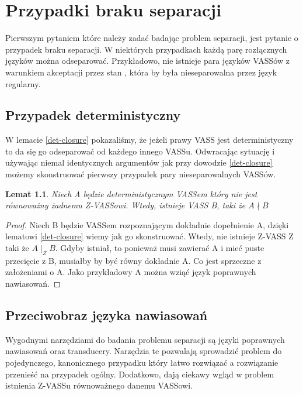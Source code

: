 \documentclass[magisterska]{pracamgr}
\newtheorem{lemma}[theorem]{Lemat}
\newtheorem{proof}[theorem]{Dowód}
\begin{document}
    \chapter{Przypadki braku separacji}

    Pierwszym pytaniem które należy zadać badając problem separacji, jest pytanie o przypadek braku separacji.
    W niektórych przypadkach każdą parę rozłącznych języków można odseparować.
    Przykładowo,  nie istnieje para języków VASSów z warunkiem akceptacji przez stan \cite{reach_sep},
    która by była nieseparowalna przez język regularny.


    \section{Przypadek deterministyczny}
    W lemacie \ref{det-closure} pokazaliśmy, że jeżeli prawy VASS jest deterministyczny to da się go odseparować od każdego innego VASSu.
    Odwracając sytuację i używając niemal identycznych argumentów jak przy dowodzie \ref{det-closure} możemy skonstruować pierwszy
    przypadek pary nieseparowalnych VASSów.

    \begin{lemma}
        \label{lemat_braku_separacji}
        Niech A będzie deterministycznym VASSem który nie jest równoważny żadnemu Z-VASSowi.
        Wtedy, istnieje VASS B, taki że $A \nmid B$


    \end{lemma}
    \begin{proof}
        Niech B będzie VASSem rozpoznającym dokładnie dopełnienie A, dzięki lematowi \ref{det-closure} wiemy jak go skonstruować.
        Wtedy, nie istnieje Z-VASS Z taki że $A \mid_Z B$.
        Gdyby istniał, to ponieważ musi zawierać A i mieć puste przecięcie z B, musiałby by być równy dokładnie A.
        Co jest sprzeczne z założeniami o A.
        Jako przykładowy A można wziąć język poprawnych nawiasowań.
    \end{proof}



    \section{Przeciwobraz języka nawiasowań}
    Wygodnymi narzędziami do badania problemu separacji są języki poprawnych nawiasowań oraz transducery.
    Narzędzia te pozwalają sprowadzić problem do pojedynczego, kanonicznego przypadku który łatwo rozwiązać a rozwiązanie
    przenieść na przypadek ogólny.
    Dodatkowo, dają ciekawy wgląd w problem istnienia Z-VASSu równoważnego danemu VASSowi.
\end{document}
